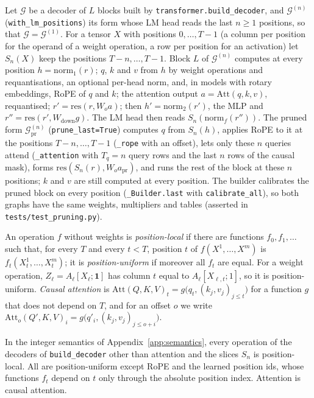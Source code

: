  Let $\mathcal G$ be a decoder of $L$ blocks built by
\texttt{transformer.build\_decoder}, and $\mathcal G^{(n)}$ (\texttt{with\_lm\_positions}) its
form whose LM head reads the last $n\ge1$ positions, so that $\mathcal G=\mathcal G^{(1)}$. For a
tensor $X$ with positions $0,\dots,T-1$ (a column per position for the operand of a weight
operation, a row per position for an activation) let $S_n(X)$ keep the positions $T-n,\dots,T-1$.
Block $L$ of $\mathcal G^{(n)}$ computes at every position $h=\mathrm{norm}_1(r)$; $q$, $k$ and $v$
from $h$ by weight operations and requantisations, an optional per-head norm, and, in models with
rotary embeddings, RoPE of $q$ and $k$; the attention output $a=\mathrm{Att}(q,k,v)$, requantised; $r'=\mathrm{res}(r,W_o a)$; then
$h'=\mathrm{norm}_2(r')$, the MLP and $r''=\mathrm{res}(r',W_{\mathrm{down}}g)$. The LM head then
reads $S_n(\mathrm{norm}_f(r''))$. The pruned form $\mathcal G^{(n)}_{\mathrm{pr}}$
(\texttt{prune\_last=True}) computes $q$ from $S_n(h)$, applies RoPE to it at the positions
$T-n,\dots,T-1$ (\texttt{\_rope} with an offset), lets only these $n$ queries attend
(\texttt{\_attention} with $T_q=n$ query rows and the last $n$ rows of the causal mask), forms
$\mathrm{res}(S_n(r),W_o a_{\mathrm{pr}})$, and runs the rest of the block at these $n$ positions;
$k$ and $v$ are still computed at every position. The builder calibrates the pruned block on every
position (\texttt{\_Builder.last} with \texttt{calibrate\_all}), so both graphs have the same
weights, multipliers and tables (asserted in \texttt{tests/test\_pruning.py}).

\begin{definition}
An operation $f$ without weights is \emph{position-local} if there are functions $f_0,f_1,\dots$
such that, for every $T$ and every $t<T$, position $t$ of $f(X^1,\dots,X^m)$ is
$f_t(X^1_t,\dots,X^m_t)$; it is \emph{position-uniform} if moreover all $f_t$ are equal. For a
weight operation, $Z_\ell=A_\ell[X_\ell;\mathbf 1]$ has column $t$ equal to $A_\ell[X_{\ell,t};1]$,
so it is position-uniform. \emph{Causal attention} is
$\mathrm{Att}(Q,K,V)_t=g\big(q_t,(k_j,v_j)_{j\le t}\big)$ for a function $g$ that does not depend on
$T$, and for an offset $o$ we write $\mathrm{Att}_o(Q',K,V)_i=g\big(q'_i,(k_j,v_j)_{j\le o+i}\big)$.
\end{definition}

\begin{lemma}
\label{lem:prune-local}
In the integer semantics of Appendix~\ref{app:semantics}, every operation of the decoders of
\texttt{build\_decoder} other than attention and the slices $S_n$ is position-local. All are
position-uniform except RoPE and the learned position ids, whose functions $f_t$ depend on $t$ only
through the absolute position index. Attention is causal attention.
\end{lemma}

